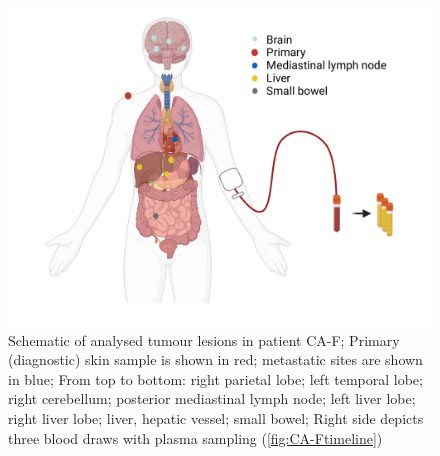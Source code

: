 \begin{figure}[!ht]
\centering
\includegraphics[width=.99\linewidth]{Figures/CA-F_schematic_organColours}
\caption[Schematic of analysed tumour lesions in patient CA-F]{Schematic of analysed tumour lesions in patient CA-F; Primary (diagnostic) skin sample is shown in red; metastatic sites are shown in blue; From top to bottom: right parietal lobe; left temporal lobe; right cerebellum; posterior mediastinal lymph node; left liver lobe; right liver lobe; liver, hepatic vessel; small bowel; Right side depicts three blood draws with plasma sampling (\protect\autoref{fig:CA-Ftimeline})}\label{fig:CA-Fschematic}
\end{figure}


\fancyhead[RO,LE]{\leftmark}
\fancyhead[RE,LO]{\rightmark}